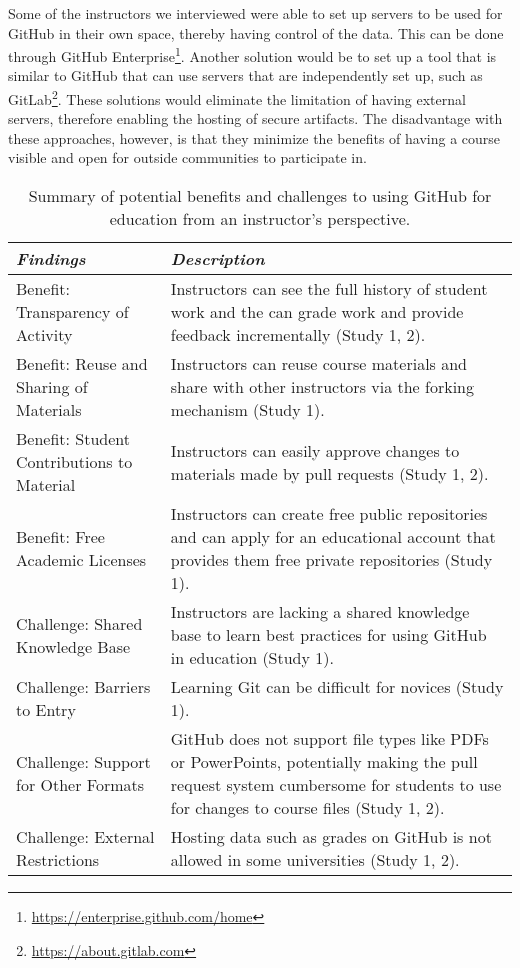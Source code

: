 Some of the instructors we interviewed were able to set up servers to be used for GitHub in their own space, thereby having control of the data. This can be done through GitHub Enterprise\footnote{\url{https://enterprise.github.com/home}}. Another solution would be to set up a tool that is similar to GitHub that can use servers that are independently set up, such as GitLab\footnote{\url{https://about.gitlab.com}}. These solutions would eliminate the limitation of having external servers, therefore enabling the hosting of secure artifacts. The disadvantage with these approaches, however, is that they minimize the benefits of having a course visible and open for outside communities to participate in.

\begin{table}[htp]
    \vspace{1pt}
        \caption{Summary of potential benefits and challenges to using GitHub for education from an instructor's perspective.}\label{table:findings:instructors}
    \vspace{1pt}
    \begin{center}
        \begin{tabular}{ | m{3cm} | m{12cm} | }
            \hline
            \emph{Findings} & \emph{Description} \\
            \hline
            Benefit: Transparency of Activity & Instructors can see the full history of student work and the can grade work and provide feedback incrementally (Study 1, 2). \\
            \hline
            Benefit: Reuse and Sharing of Materials & Instructors can reuse course materials and share with other instructors via the forking mechanism (Study 1). \\
            \hline
            Benefit: Student Contributions to Material & Instructors can easily approve changes to materials made by pull requests (Study 1, 2). \\
            \hline
            Benefit: Free Academic Licenses & Instructors can create free public repositories and can apply for an educational account that provides them free private repositories (Study 1). \\
            \hline
            Challenge: Shared Knowledge Base​ & Instructors are lacking a shared knowledge base to learn best practices for using GitHub in education (Study 1). \\
            \hline
            Challenge: Barriers to Entry & Learning Git can be difficult for novices (Study 1)​. \\
            \hline
            Challenge: Support for Other Formats & GitHub does not support file types like PDFs or PowerPoints, potentially making the pull request system cumbersome for students to use for changes to course files (Study 1, 2). \\
            \hline
            Challenge: External Restrictions & Hosting data such as grades on GitHub is not allowed in some universities (Study 1, 2). \\
            \hline
        \end{tabular}
    \end{center}
\end{table}

